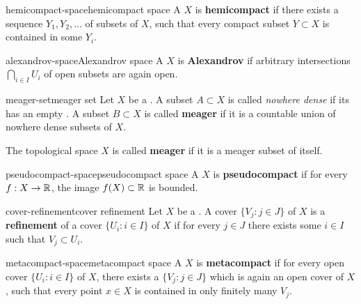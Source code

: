 \begin{topic}{hemicompact-space}{hemicompact space}
    A  $X$ is \textbf{hemicompact} if there exists a sequence $Y_1, Y_2, \ldots$ of  subsets of $X$, such that every compact subset $Y \subset X$ is contained in some $Y_i$.
\end{topic}

\begin{topic}{alexandrov-space}{Alexandrov space}
    A  $X$ is \textbf{Alexandrov} if arbitrary intersections $\bigcap_{i \in I} U_i$ of open subsets are again open.
\end{topic}

\begin{topic}{meager-set}{meager set}
    Let $X$ be a . A subset $A \subset X$ is called \textit{nowhere dense} if its  has an empty . A subset $B \subset X$ is called \textbf{meager} if it is a countable union of nowhere dense subsets of $X$.
    
    The topological space $X$ is called \textbf{meager} if it is a meager subset of itself.
\end{topic}

\begin{topic}{pseudocompact-space}{pseudocompact space}
    A  $X$ is \textbf{pseudocompact} if for every  $f : X \to \mathbb{R}$, the image $f(X) \subset \mathbb{R}$ is bounded.
\end{topic}

\begin{topic}{cover-refinement}{cover refinement}
    Let $X$ be a . A cover $\{ V_j : j \in J \}$ of $X$ is a \textbf{refinement} of a cover $\{ U_i : i \in I \}$ of $X$ if for every $j \in J$ there exists some $i \in I$ such that $V_j \subset U_i$.
\end{topic}

\begin{topic}{metacompact-space}{metacompact space}
    A  $X$ is \textbf{metacompact} if for every open cover $\{ U_i : i \in I \}$ of $X$, there exists a  $\{ V_j : j \in J \}$ which is again an open cover of $X$, such that every point $x \in X$ is contained in only finitely many $V_j$.
\end{topic}

